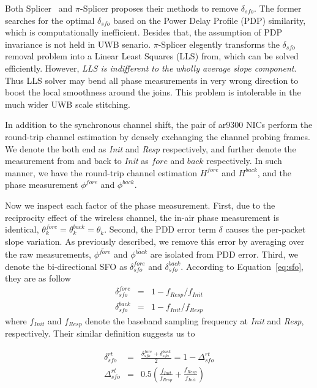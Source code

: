 Both Splicer~\cite{Xie2015Precise} and $\pi$-Splicer\cite{Zhu:2018fc} 
proposes their methods to remove $\delta_{sfo}$. 
The former searches for the optimal $\delta_{sfo}$ 
based on the Power Delay Profile (PDP) similarity, 
which is computationally inefficient. 
Besides that, the assumption of PDP invariance is not held in UWB senario. 
$\pi$-Splicer\cite{Zhu:2018fc} elegently transforms the $\delta_{sfo}$ removal problem
into a Linear Least Squares (LLS) from, 
which can be solved efficiently.
However, 
\textit{LLS is indifferent to the wholly average slope component}.
Thus LLS solver may bend all phase measurements in very wrong direction
to boost the local smoothness around the joins.
This problem is intolerable in the much wider UWB scale stitching.

In addition to the synchronous channel shift, 
the pair of ar9300 NICs perform the round-trip channel estimation 
by densely exchanging the channel probing frames.
We denote the both end as \textit{Init} and \textit{Resp} respectively,
and further denote the measurement from and back to \textit{Init} as $fore$ and $back$ respectively.
In such manner, we have the round-trip channel estimation $H^{fore}$ and $H^{back}$,
and the phase measurement $\phi^{fore}$ and $\phi^{back}$.

Now we inspect each factor of the phase measurement.
First, due to the reciprocity effect of the wireless channel,
the in-air phase measurement is identical, 
\ie $\theta_k^{fore} = \theta_k^{back} = \theta_k$.
%
Second, the PDD error term $\delta$ causes the per-packet slope variation.
As previously described, 
we remove this error by averaging over the raw measurements, 
\ie $\bar{\phi^{fore}}$ and $\bar{\phi^{back}}$ are isolated from PDD error.
%
Third, we denote the bi-directional SFO as $\delta_{sfo}^{fore}$ and $\delta_{sfo}^{back}$.
According to Equation~\ref{eq:sfo}, they are as follow 
\begin{eqnarray}
	\delta_{sfo}^{fore} & = & 1 - f_{Resp} / f_{Init} \nonumber \\
	\delta_{sfo}^{back} & = & 1 - f_{Init} / f_{Resp} \nonumber
\end{eqnarray}
where $f_{Init}$ and $f_{Resp}$ denote the baseband sampling frequency at \textit{Init} and \textit{Resp}, respectively. 
Their similar definition suggests us to 

\begin{eqnarray}
	\delta_{sfo}^{rt} & = & \frac{\delta_{sfo}^{fore} + \delta_{sfo}^{back}}{2} = 1 - \Delta_{sfo}^{rt} \\
	\Delta_{sfo}^{rt} & = & 0.5(\frac{f_{Init}}{f_{Resp}} + \frac{f_{Resp}}{f_{Init}}) \nonumber
	\label{eq:sfo_rt}
\end{eqnarray}

